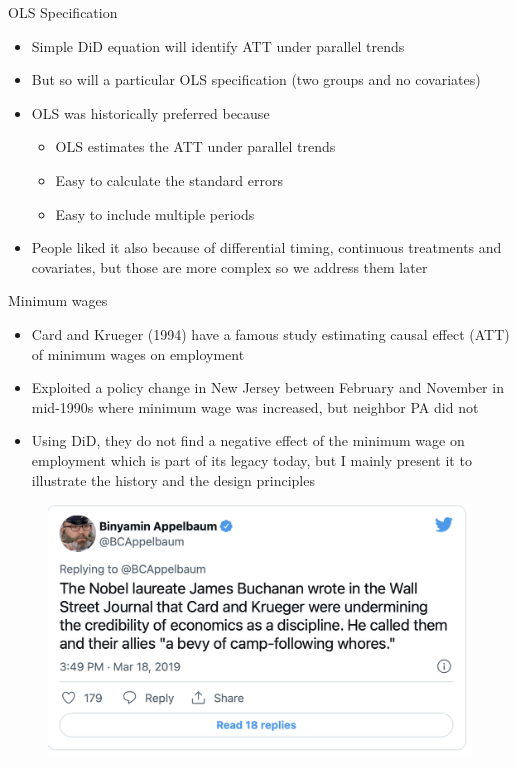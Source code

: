 \documentclass{beamer}
\begin{document}
\begin{frame}{OLS Specification}
	
	\begin{itemize}
	\item Simple DiD equation will identify ATT under parallel trends
	\item But so will a particular OLS specification (two groups and no covariates)
	\item OLS was historically preferred because
		\begin{itemize}
		\item OLS estimates the ATT under parallel trends
		\item Easy to calculate the standard errors
		\item Easy to include multiple periods
		\end{itemize}
	\item People liked it also because of differential timing, continuous treatments and covariates, but those are more complex so we address them later
	\end{itemize}
\end{frame}

\begin{frame}{Minimum wages}

\begin{itemize}
\item Card and Krueger (1994) have a famous study estimating causal effect (ATT) of minimum wages on employment
\item Exploited a policy change in New Jersey between February and November in mid-1990s where minimum wage was increased, but neighbor PA did not
\item Using DiD, they do not find a negative effect of the minimum wage on employment which is part of its legacy today, but I mainly present it to illustrate the history and the design principles
\end{itemize}

\end{frame}

\begin{frame}
	\begin{figure}
	\includegraphics[scale=0.5]{./lecture_includes/minwage_whore}
	\end{figure}
\end{frame}
\end{document}
